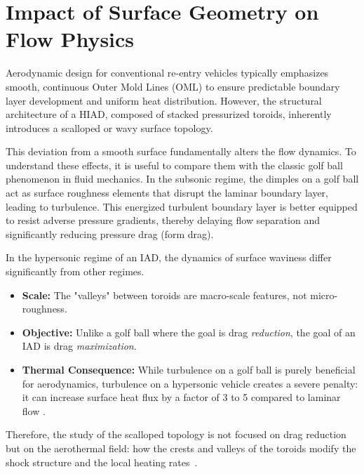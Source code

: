 \section{Impact of Surface Geometry on Flow Physics}
Aerodynamic design for conventional re-entry vehicles typically emphasizes smooth, continuous Outer Mold Lines (OML) to ensure predictable boundary layer development and uniform heat distribution. However, the structural architecture of a HIAD, composed of stacked pressurized toroids, inherently introduces a scalloped or wavy surface topology.
\par
This deviation from a smooth surface fundamentally alters the flow dynamics. To understand these effects, it is useful to compare them with the classic golf ball phenomenon in fluid mechanics. In the subsonic regime, the dimples on a golf ball act as surface roughness elements that disrupt the laminar boundary layer, leading to turbulence. This energized turbulent boundary layer is better equipped to resist adverse pressure gradients, thereby delaying flow separation and significantly reducing pressure drag (form drag).

In the hypersonic regime of an IAD, the dynamics of surface waviness differ significantly from other regimes.
\begin{itemize}
    \item \textbf{Scale:} The "valleys" between toroids are macro-scale features, not micro-roughness.

    \item \textbf{Objective:} Unlike a golf ball where the goal is drag \textit{reduction}, the goal of an IAD is drag \textit{maximization}.

    \item \textbf{Thermal Consequence:} While turbulence on a golf ball is purely beneficial for aerodynamics, turbulence on a hypersonic vehicle creates a severe penalty: it can increase surface heat flux by a factor of 3 to 5 compared to laminar flow \cite{AndersonHypersonic}.
\end{itemize}

Therefore, the study of the scalloped topology is not focused on drag reduction but on the aerothermal field: how the crests and valleys of the toroids modify the shock structure and the local heating rates~\cite{white2006viscous}.

